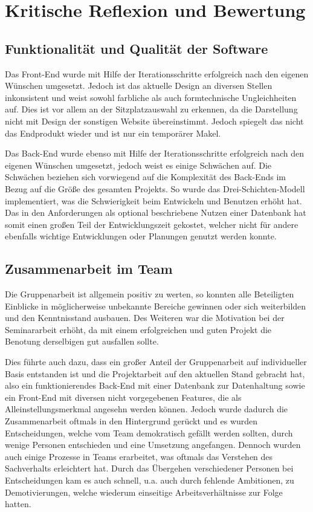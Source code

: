 \section{Kritische Reflexion und Bewertung}

\subsection{Funktionalität und Qualität der Software}

Das Front-End wurde mit Hilfe der Iterationsschritte erfolgreich nach den eigenen Wünschen umgesetzt.
Jedoch ist das aktuelle Design an diversen Stellen inkonsistent und weist sowohl farbliche als auch formtechnische Ungleichheiten auf.
Dies ist vor allem an der Sitzplatzauswahl zu erkennen, da die Darstellung nicht mit Design der sonstigen Website übereinstimmt.
Jedoch spiegelt das nicht das Endprodukt wieder und ist nur ein temporärer Makel.

Das Back-End wurde ebenso mit Hilfe der Iterationsschritte erfolgreich nach den eigenen Wünschen umgesetzt, jedoch weist es einige Schwächen auf.
Die Schwächen beziehen sich vorwiegend auf die Komplexität des Back-Ends im Bezug auf die Größe des gesamten Projekts.
So wurde das Drei-Schichten-Modell implementiert, was die Schwierigkeit beim Entwickeln und Benutzen erhöht hat.
Das in den Anforderungen als optional beschriebene Nutzen einer Datenbank hat somit einen großen Teil der Entwicklungszeit gekostet, welcher nicht für andere ebenfalls wichtige Entwicklungen oder Planungen genutzt werden konnte.

\subsection{Zusammenarbeit im Team}

Die Gruppenarbeit ist allgemein positiv zu werten, so konnten alle Beteiligten Einblicke in möglicherweise unbekannte Bereiche gewinnen oder sich weiterbilden und den Kenntnisstand ausbauen.
Des Weiteren war die Motivation bei der Seminararbeit erhöht, da mit einem erfolgreichen und guten Projekt die Benotung derselbigen gut ausfallen sollte.

Dies führte auch dazu, dass ein großer Anteil der Gruppenarbeit auf individueller Basis entstanden ist und die Projektarbeit auf den aktuellen Stand gebracht hat, also ein funktionierendes Back-End mit einer Datenbank zur Datenhaltung sowie ein Front-End mit diversen nicht vorgegebenen Features, die als Alleinstellungsmerkmal angesehn werden können.
Jedoch wurde dadurch die Zusammenarbeit oftmals in den Hintergrund gerückt und es wurden Entscheidungen, welche vom Team demokratisch gefällt werden sollten, durch wenige Personen entschieden und eine Umsetzung angefangen. Dennoch wurden auch einige Prozesse in Teams erarbeitet, was oftmals das Verstehen des Sachverhalts erleichtert hat.
Durch das Übergehen verschiedener Personen bei Entscheidungen kam es auch schnell, u.a. auch durch fehlende Ambitionen, zu Demotivierungen, welche wiederum einseitige Arbeitsverhältnisse zur Folge hatten.

